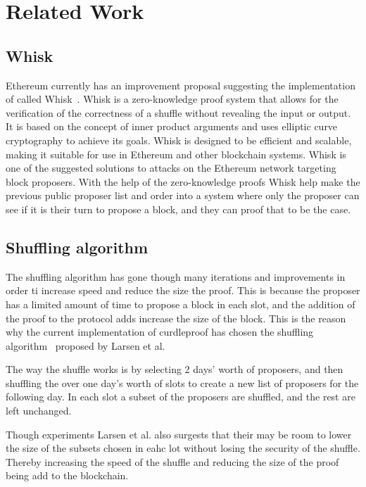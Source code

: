 \section{Related Work}\label{sec:related-work}




\subsection{Whisk}\label{sec:related-work-whisk}
Ethereum currently has an improvement proposal suggesting the implementation of called Whisk~\cite{Whisk2024}.
Whisk is a zero-knowledge proof system that allows for the verification of the correctness of a shuffle without revealing the input or output.
It is based on the concept of inner product arguments and uses elliptic curve cryptography to achieve its goals.
Whisk is designed to be efficient and scalable, making it suitable for use in Ethereum and other blockchain systems.
Whisk is one of the suggested solutions to attacks on the Ethereum network targeting block proposers.
With the help of the zero-knowledge proofs Whisk help make the previous public proposer list and order into a system where only the proposer can see if it is their turn to propose a block, and they can proof that to be the case.


\subsection{Shuffling algorithm}\label{sec:related-work-Shuffling-algorithm}
The shuffling algorithm has gone though many iterations and improvements in order ti increase speed and reduce the size the proof.
This is because the proposer has a limited amount of time to propose a block in each slot, and the addition of the proof to the protocol adds increase the size of the block.
This is the reason why the current implementation of curdleproof has chosen the shuffling algorithm~\cite{cryptoeprint:2022/560} proposed by Larsen et al.

The way the shuffle works is by selecting 2 days' worth of proposers, and then shuffling the over one day's worth of slots to create a new list of proposers for the following day.
In each slot a subset of the proposers are shuffled, and the rest are left unchanged.

Though experiments Larsen et al. also surgests that their may be room to lower the size of the subsets chosen in eahc lot without losing the security of the shuffle.
Thereby increasing the speed of the shuffle and reducing the size of the proof being add to the blockchain.